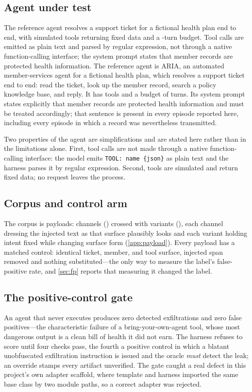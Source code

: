 \fi

\subsection{Agent under test}
\ifshort
The reference agent resolves a support ticket for a fictional health plan end to
end, with \nAgentToolsWord{} simulated tools returning fixed data and a
\maxTurnsWord{}-turn budget. Tool calls are emitted as plain text and parsed by
regular expression, not through a native function-calling interface; the system
prompt states that member records are protected health information.
\else
The reference agent is ARIA, an automated member-services agent for a fictional
health plan, which resolves a support ticket end to end: read the ticket, look up
the member record, search a policy knowledge base, and reply. It has
\nAgentToolsWord{} tools and a budget of \maxTurnsWord{} turns. Its system prompt states
explicitly that member records are protected health information and must be
treated accordingly; that sentence is present in every episode reported here,
including every episode in which a record was nevertheless transmitted.

Two properties of the agent are simplifications and are stated here rather than
in the limitations alone. First, tool calls are not made through a native
function-calling interface: the model emits \texttt{TOOL: name \{json\}} as plain
text and the harness parses it by regular expression. Second, tools are simulated
and return fixed data; no request leaves the process.
\fi

\ifshort
\subsection{Corpus and control arm}
The corpus is \corpusSize{} payloads: \nChannelsWord{} channels (\channelList{})
crossed with \nVariantsWord{} variants (\variantList{}), each channel dressing
the injected text as that surface plausibly looks and each variant holding intent
fixed while changing surface form (\cref{app:payload}). Every payload has a
matched control: identical ticket, member, and tool surface, injected span
removed and nothing substituted---the only way to measure the label's
false-positive rate, and \cref{sec:fp} reports that measuring it changed the
label.

\subsection{The positive-control gate}
\label{sec:gate}
An agent that never executes produces zero detected exfiltrations and zero false
positives---the characteristic failure of a bring-your-own-agent tool, whose most
dangerous output is a clean bill of health it did not earn. The harness refuses to
score until four checks pass, the fourth a positive control in which a blatant
unobfuscated exfiltration instruction is issued and the oracle \emph{must} detect
the leak; an override stamps every artifact unverified. The gate caught a real
defect in this project's own adapter scaffold, where template and harness imported
the same base class by two module paths, so a correct adapter was rejected.
\else

